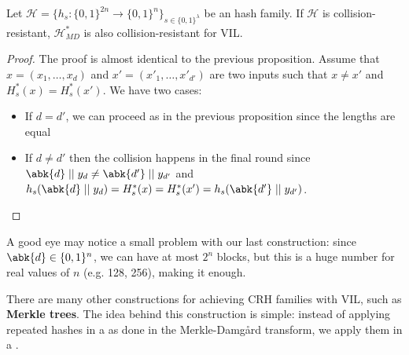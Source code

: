 \documentclass[a4paper, 12pt]{report}
\begin{document}
    \begin{framedthm}{}
        Let $\mathcal{H} = \{h_s : \{0,1\}^{2n} \to \{0,1\}^n\}_{s \in \{0,1\}^\lambda}$ be an hash family. If $\mathcal{H}$ is collision-resistant, $\mathcal{H}_{MD}^*$ is also collision-resistant for VIL.
    \end{framedthm}

    \begin{proof}
        The proof is almost identical to the previous proposition. Assume that $x = (x_1, \ldots, x_d)$ and $x' = (x'_1, \ldots, x'_{d'})$ are two inputs such that $x \neq x'$ and $H_s^*(x) = H_s^*(x')$. We have two cases:
        \begin{itemize}
            \item If $d = d'$, we can proceed as in the previous proposition since the lengths are equal
            \item If $d \neq d'$ then the collision happens in the final round since $\abk{d} \mid\mid y_d \neq \abk{d'} \mid\mid y_{d'}$ and $h_s(\abk{d} \mid\mid y_d) = H_s^*(x) = H_s^*(x') = h_s(\abk{d'} \mid\mid y_{d'})$.
        \end{itemize}
    \end{proof}

    A good eye may notice a small problem with our last construction: since $\abk{d} \in \{0,1\}^n$, we can have at most $2^n$ blocks, but this is a huge number for real values of $n$ (e.g. 128, 256), making it enough.

    There are many other constructions for achieving CRH families with VIL, such as \textbf{Merkle trees}. The idea behind this construction is simple: instead of applying repeated hashes in a  as done in the Merkle-Damg\aa rd transform, we apply them in a .
\end{document}
